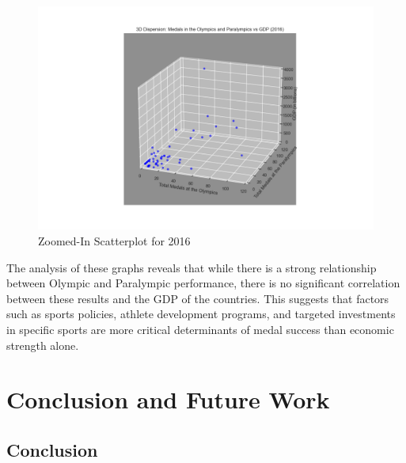 \documentclass{article}
\begin{document}
\begin{figure}[H]
    \centering
    \includegraphics[width=\linewidth]{images/gdp_analysis/scatterplot_olympics_paralympics_pib_2016_approximate.png}
    \caption{Zoomed-In Scatterplot for 2016}
    \label{fig:scatterplot_zoomed}
\end{figure}

The analysis of these graphs reveals that while there is a strong relationship between Olympic and Paralympic performance, there is no significant correlation between these results and the GDP of the countries. This suggests that factors such as sports policies, athlete development programs, and targeted investments in specific sports are more critical determinants of medal success than economic strength alone.


\section{Conclusion and Future Work}
\subsection{Conclusion}
\end{document}
